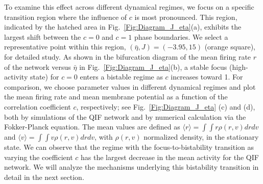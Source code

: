 \documentclass[aps,twocolumn,pre]{revtex4-2}
\begin{document}
To examine this effect across different dynamical regimes, we focus on a specific transition region where the influence of $c$ is most pronounced. This region, indicated by the hatched area in Fig.~\ref{Fig:Diagram_J_eta}(a), exhibits the largest shift between the $c=0$ and $c=1$ phase boundaries. We select a representative point within this region, $(\bar{\eta},J)=(-3.95, 15)$ (orange square), for detailed study. As shown in the bifurcation diagram of the mean firing rate $r$ of the network versus $\bar{\eta}$ in Fig.~\ref{Fig:Diagram_J_eta}(b), a stable focus (high-activity state) for $c=0$ enters a bistable regime as $c$ increases toward 1. For comparison, we choose parameter values in different dynamical regimes and plot the mean firing rate and mean membrane potential as a function of the correlation coefficient $c$, respectively; see Fig.~\ref{Fig:Diagram_J_eta} (c) and (d), both by simulations of the QIF network and by numerical calculation via the Fokker-Planck equation. The mean values are defined as $\langle r\rangle=\int\int r\rho(r,v)drdv$ and $\langle v\rangle=\int\int v\rho(r,v)drdv$, with $\rho(r,v)$ normalized density, in the stationary state. We can observe that the regime with the focus-to-bistability transition as varying the coefficient $c$ has the largest decrease in the mean activity for the QIF network.
We will analyze the mechanisms underlying this bistability transition in detail in the next section.
\end{document}
